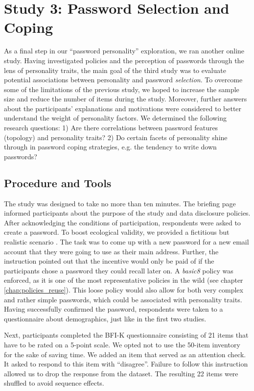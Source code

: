 \section{Study 3: Password Selection and Coping}
As a final step in our ``password personality'' exploration, we ran another online study. Having investigated policies and the perception of passwords through the lens of personality traits, the main goal of the third study was to evaluate potential associations between personality and password \textit{selection}. To overcome some of the limitations of the previous study, we hoped to increase the sample size and reduce the number of items during the study. Moreover, further answers about the participants' explanations and motivations were considered to better understand the weight of personality factors. We determined the following research questions: 1) Are there correlations between password features (topology) and personality traits? 2) Do certain facets of personality shine through in password coping strategies, e.g. the tendency to write down passwords?

\subsection{Procedure and Tools}
The study was designed to take no more than ten minutes. The briefing page informed participants about the purpose of the study and data disclosure policies. After acknowledging the conditions of participation, respondents were asked to create a password. To boost ecological validity, we provided a fictitious but realistic scenario \cite{Komanduri2011OfPasswordsAndPeople}. The task was to come up with a new password for a new email account that they were going to use as their main address. Further, the instruction pointed out that the incentive would only be paid of if the participants chose a password they could recall later on. A \textit{basic8} policy was enforced, as it is one of the most representative policies in the wild (see chapter \ref{chap:policies_reuse}). This loose policy would also allow for both very complex and rather simple passwords, which could be associated with personality traits. Having successfully confirmed the password, respondents were taken to a questionnaire about demographics, just like in the first two studies. 

Next, participants completed the BFI-K questionnaire consisting of 21 items that have to be rated on a 5-point scale. We opted not to use the 50-item inventory for the sake of saving time. We added an item that served as an attention check. It asked to respond to this item with ``disagree''. Failure to follow this instruction allowed us to drop the response from the dataset. The resulting 22 items were shuffled to avoid sequence effects. 

